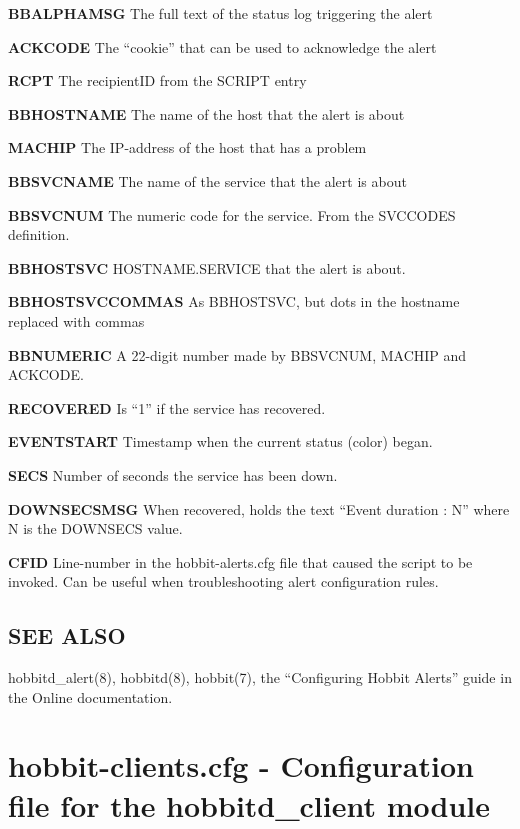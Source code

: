  \textbf{BBALPHAMSG}
 The full text of the status log triggering the alert 


 \textbf{ACKCODE}
 The ``cookie'' that can be used to acknowledge the alert 


 \textbf{RCPT}
 The recipientID from the SCRIPT entry 


 \textbf{BBHOSTNAME}
 The name of the host that the alert is about 


 \textbf{MACHIP}
 The IP-address of the host that has a problem 


 \textbf{BBSVCNAME}
 The name of the service that the alert is about 


 \textbf{BBSVCNUM}
 The numeric code for the service. From the SVCCODES definition. 


 \textbf{BBHOSTSVC}
 HOSTNAME.SERVICE that the alert is about. 


 \textbf{BBHOSTSVCCOMMAS}
 As BBHOSTSVC, but dots in the hostname replaced with commas 


 \textbf{BBNUMERIC}
 A 22-digit number made by BBSVCNUM, MACHIP and ACKCODE. 


 \textbf{RECOVERED}
 Is ``1'' if the service has recovered. 


 \textbf{EVENTSTART}
 Timestamp when the current status (color) began. 


 \textbf{SECS}
 Number of seconds the service has been down. 


 \textbf{DOWNSECSMSG}
 When recovered, holds the text ``Event duration : N'' where N is the DOWNSECS value. 


 \textbf{CFID}
 Line-number in the hobbit-alerts.cfg file that caused the script to be invoked. Can be useful when troubleshooting alert configuration rules. 


 
\subsection{SEE ALSO}
hobbitd\_alert(8), hobbitd(8), hobbit(7), the ``Configuring Hobbit Alerts'' guide in the Online documentation. 

 


  

%
\newpage
\section{hobbit-clients.cfg - Configuration file for the hobbitd\_client module}
 
